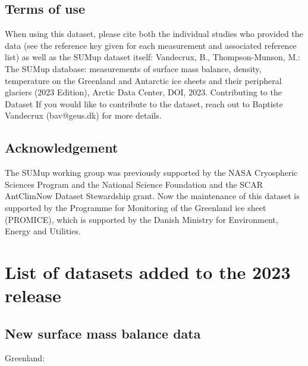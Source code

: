 \documentclass[journal abbreviation, manuscript]{copernicus}
\begin{document}
\subsection{Terms of use}

When using this dataset, please cite both the individual studies who provided the data (see the reference key given for each measurement and associated reference list) as well as the SUMup dataset itself:
Vandecrux, B., Thompson-Munson, M.: The SUMup database: measurements of surface mass balance, density, temperature on the Greenland and Antarctic ice sheets and their peripheral glaciers (2023 Edition), Arctic Data Center, DOI, 2023.
Contributing to the Dataset
If you would like to contribute to the dataset, reach out to Baptiste Vandecrux (bav@geus.dk) for more details.

\subsection{Acknowledgement}

The SUMup working group was previously supported by the NASA Cryospheric Sciences Program and the National Science Foundation and the SCAR AntClimNow Dataset Stewardship grant. Now the maintenance of this dataset is supported by the Programme for Monitoring of the Greenland ice sheet (PROMICE), which is supported by the Danish Ministry for Environment, Energy and Utilities.

\section{List of datasets added to the 2023 release}
\subsection{New surface mass balance data}

Greenland:
\end{document}
